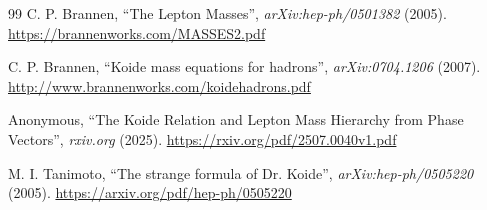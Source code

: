\begin{thebibliography}{99}
		C. P. Brannen, ``The Lepton Masses'', \textit{arXiv:hep-ph/0501382} (2005).
		\url{https://brannenworks.com/MASSES2.pdf}
		
		C. P. Brannen, ``Koide mass equations for hadrons'', \textit{arXiv:0704.1206} (2007).
		\url{http://www.brannenworks.com/koidehadrons.pdf}
		
		Anonymous, ``The Koide Relation and Lepton Mass Hierarchy from Phase Vectors'', \textit{rxiv.org} (2025).
		\url{https://rxiv.org/pdf/2507.0040v1.pdf}
		
		M. I. Tanimoto, ``The strange formula of Dr. Koide'', \textit{arXiv:hep-ph/0505220} (2005).
		\url{https://arxiv.org/pdf/hep-ph/0505220}
		
	\end{thebibliography}
	